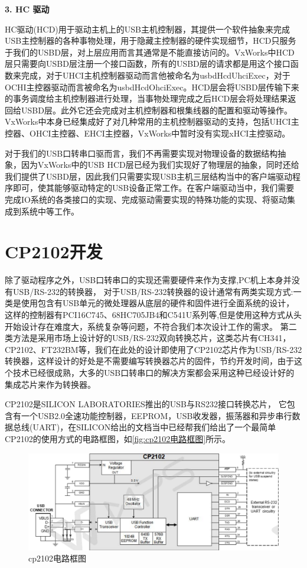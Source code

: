 \noindent \textbf{3. HC 驱动}
	
	HC驱动(HCD)用于驱动主机上的USB主机控制器，其提供一个软件抽象来完成USB主控制器的各种事物处理，用于隐藏主控制器的硬件实现细节，HCD只服务于我们的USBD层，对上层应用而言其通常是不能直接访问的。VxWorks中HCD层只需要向USBD层注册一个接口函数，所有的USBD层的请求都是用这个接口函数来完成，对于UHCI主机控制器驱动而言他被命名为usbdHcdUhciExec，对于OCHI主控器驱动而言被命名为usbdHcdOhciExec。HCD层会将USBD层传输下来的事务调度给主机控制器进行处理，当事物处理完成之后HCD层会将处理结果返回给USBD层。此外它还会完成对主机控制器和根集线器的配置和驱动等操作\cite{李雪红2004USB}。VxWorks中本身已经集成好了对几种常用的主机控制器驱动的支持，包括UHCI主控器、OHCI主控器、EHCI主控器，VxWorks中暂时没有实现xHCI主控驱动。
	
	对于我们的USB口转串口驱而言，我们不再需要实现对物理设备的数据结构抽象，因为VxWorks中的USB HCD层已经为我们实现好了物理层的抽象，同时还给我们提供了USBD层，因此我们只需要实现USB主机三层结构当中的客户端驱动程序即可，使其能够驱动特定的USB设备正常工作。在客户端驱动当中，我们需要完成IO系统的各类接口的实现、完成驱动需要实现的特殊功能的实现、将驱动集成到系统中等工作。
	

\section{CP2102开发}
	除了驱动程序之外，USB口转串口的实现还需要硬件来作为支撑,PC机上本身并没有USB/RS-232的转换器，
	对于USB/RS-232转换器的设计通常有两类实现方式:一类是使用包含有USB单元的微处理器从底层的硬件和固件进行全面系统的设计，这样的控制器有PCI16C745、68HC705JB4和C541U系列等\cite{USB与RS232接口转换器的设计},但是使用这种方式从头开始设计存在难度大，系统复杂等问题，不符合我们本次设计工作的需求。
	第二类方法是采用市场上设计好的USB/RS-232双向转换芯片，这类芯片有CH341，CP2102、FT232BM等，我们在此处的设计即使用了CP2102芯片作为USB/RS-232转换器，这样设计的好处是不需要编写转换器芯片的固件，节约开发时间，由于这个技术已经很成熟，大多的USB口转串口的解决方案都会采用这种已经设计好的集成芯片来作为转换器。
	
	CP2102是SILICON LABORATORIES推出的USB与RS232接口转换芯片，
	它包含有一个USB2.0全速功能控制器，EEPROM，USB收发器，振荡器和异步串行数据总线(UART)，在SILICON给出的文档当中已经帮我们给出了一个最简单 CP2102的使用方式的电路框图，如\autoref{fig:cp2102电路框图}所示。
\begin{figure}[!h]
\centering
\includegraphics[width=1.0\textwidth]{./graphics/cp2102-circuit-diagram.pdf}
\caption{cp2102电路框图}\label{fig:cp2102电路框图}
\end{figure}

